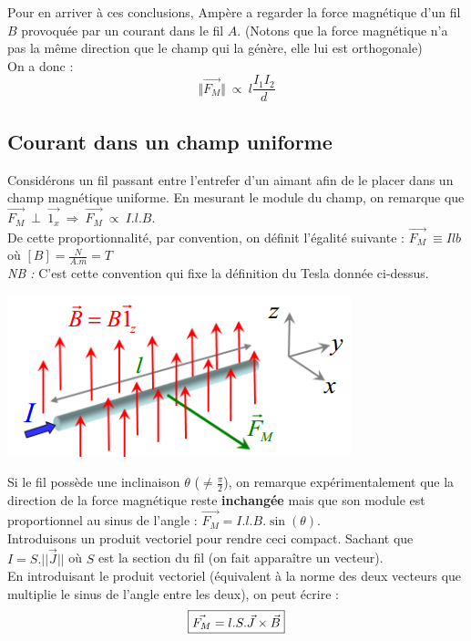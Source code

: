 \documentclass	[11pt, a4paper, openany]{book}
\begin{document}
Pour en arriver à ces conclusions, Ampère a regarder la force magnétique d'un fil $B$ provoquée par un courant dans le fil $A$. (Notons que la force magnétique n'a pas la même direction que le champ qui la génère, elle lui est orthogonale)
\\
On a donc :
\begin{equation}
	\Vert \vec{F_M} \Vert\ \propto\ l \frac{I_1 I_2}{d}
\end{equation}

\subsection{Courant dans un champ uniforme}
Considérons un fil passant entre l'entrefer d'un aimant afin de le placer dans un champ magnétique uniforme. En mesurant le module du champ, on remarque que $\vec{F_M}\ \perp\ \vec{1_x}\ \Rightarrow\ \vec{F_M}\ \propto\ I.l.B$.\\
De cette proportionnalité, par convention, on définit l'égalité suivante : $ \vec{F_M}\ \equiv Ilb$ où $[B] = \frac{N}{A.m} = T$\\

\textit{NB :} C'est cette convention qui fixe la définition du Tesla donnée ci-dessus.
\begin{center}
	\includegraphics[scale=0.55]{magneto/image1.png}
\end{center}
Si le fil possède une inclinaison $\theta$ ($\neq \frac{\pi}{2}$), on remarque expérimentalement que la direction de la force magnétique reste \textbf{inchangée} mais que son module est proportionnel au sinus de l'angle : $\vec{F_M} = I.l.B.\sin(\theta)$.
\\

Introduisons un produit vectoriel pour rendre ceci compact. Sachant que $I = S.||\vec{J}||$ où $S$ est la section du fil (on fait apparaître un vecteur). \\
En introduisant le produit vectoriel (équivalent à la norme des deux vecteurs que multiplie le sinus de l'angle entre les deux), on peut écrire : 
\begin{equation}
	\fbox{$\vec{F_M} = l.S.\vec{J} \times \vec{B} $}
\end{equation}
\end{document}
